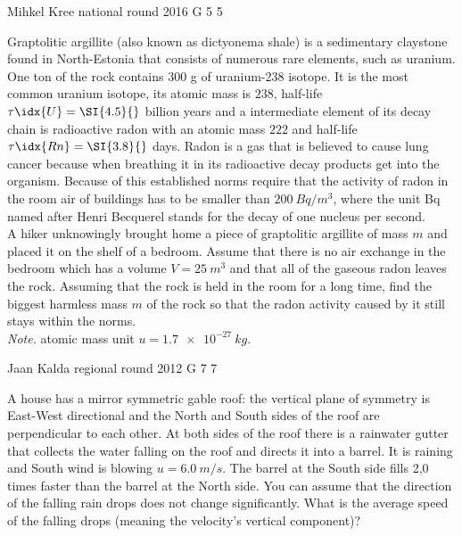 \documentclass[11pt]{article}
\begin{document}
{Mihkel Kree} %
{national round} %
{2016} %
{G 5} %
{5} %
{

\ifEngStatement
Graptolitic argillite (also known as dictyonema shale) is a sedimentary claystone found in North-Estonia that consists of numerous rare elements, such as uranium. One ton of the rock contains 300 g of uranium-238 isotope. It is the most common uranium isotope, its atomic mass is $238$, half-life $\tau\idx{U}=\SI{4.5}{}$ billion years and a intermediate element of its decay chain is radioactive radon with an atomic mass $222$ and half-life $\tau\idx{Rn}=\SI{3.8}{}$ days. Radon is a gas that is believed to cause lung cancer because when breathing it in its radioactive decay products get into the organism. Because of this established norms require that the activity of radon in the room air of buildings has to be smaller than $\SI{200}{Bq/m^3}$, where the unit Bq named after Henri Becquerel stands for the decay of one nucleus per second.\\
A hiker unknowingly brought home a piece of graptolitic argillite of mass $m$ and placed it on the shelf of a bedroom. Assume that there is no air exchange in the bedroom which has a volume $V=\SI{25}{m^3}$ and that all of the gaseous radon leaves the rock. Assuming that the rock is held in the room for a long time, find the biggest harmless mass $m$ of the rock so that the radon activity caused by it still stays within the norms.\\
\emph{Note.} atomic mass unit $u=\SI{1.7e-27}{kg}$.
\fi
}

{Jaan Kalda} %
{regional round} %
{2012} %
{G 7} %
{7} %
{

\ifEngStatement
A house has a mirror symmetric gable roof: the vertical plane of symmetry is East-West directional and the North and South sides of the roof are perpendicular to each other. At both sides of the roof there is a rainwater gutter that collects the water falling on the roof and directs it into a barrel. It is raining and South wind is blowing $u= \SI{6,0}{m/s}$. The barrel at the South side fills 2,0 times faster than the barrel at the North side. You can assume that the direction of the falling rain drops does not change significantly. What is the average speed of the falling drops (meaning the velocity’s vertical component)?
\fi
}
\end{document}
